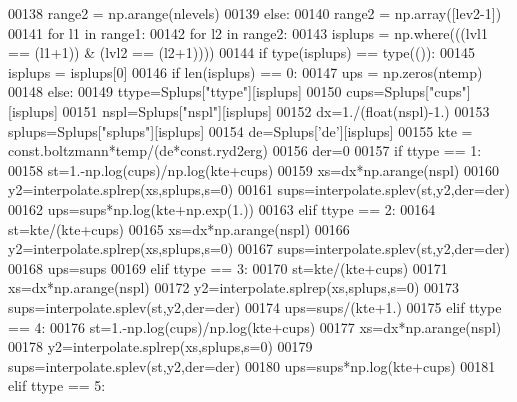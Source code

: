 \begin{DoxyCode}
00138         range2 = np.arange(nlevels)
00139     \textcolor{keywordflow}{else}:
00140         range2 = np.array([lev2-1])
00141     \textcolor{keywordflow}{for} l1 \textcolor{keywordflow}{in} range1:
00142         \textcolor{keywordflow}{for} l2 \textcolor{keywordflow}{in} range2:
00143             isplups = np.where(((lvl1 == (l1+1)) & (lvl2 == (l2+1))))
00144             \textcolor{keywordflow}{if} type(isplups) == type(()):
00145                 isplups = isplups[0]                
00146             \textcolor{keywordflow}{if} len(isplups) == 0:
00147                 ups = np.zeros(ntemp)
00148             \textcolor{keywordflow}{else}:
00149                 ttype=Splups[\textcolor{stringliteral}{"ttype"}][isplups]
00150                 cups=Splups[\textcolor{stringliteral}{"cups"}][isplups]
00151                 nspl=Splups[\textcolor{stringliteral}{"nspl"}][isplups]
00152                 dx=1./(float(nspl)-1.)
00153                 splups=Splups[\textcolor{stringliteral}{"splups"}][isplups]
00154                 de=Splups[\textcolor{stringliteral}{'de'}][isplups]
00155                 kte = const.boltzmann*temp/(de*const.ryd2erg)
00156                 der=0
00157                 \textcolor{keywordflow}{if} ttype == 1:
00158                     st=1.-np.log(cups)/np.log(kte+cups)
00159                     xs=dx*np.arange(nspl)
00160                     y2=interpolate.splrep(xs,splups,s=0)
00161                     sups=interpolate.splev(st,y2,der=der)
00162                     ups=sups*np.log(kte+np.exp(1.))
00163                 \textcolor{keywordflow}{elif} ttype == 2:
00164                     st=kte/(kte+cups)
00165                     xs=dx*np.arange(nspl)
00166                     y2=interpolate.splrep(xs,splups,s=0)
00167                     sups=interpolate.splev(st,y2,der=der)
00168                     ups=sups
00169                 \textcolor{keywordflow}{elif} ttype == 3:
00170                     st=kte/(kte+cups)
00171                     xs=dx*np.arange(nspl)
00172                     y2=interpolate.splrep(xs,splups,s=0)
00173                     sups=interpolate.splev(st,y2,der=der)
00174                     ups=sups/(kte+1.)
00175                 \textcolor{keywordflow}{elif} ttype == 4:
00176                     st=1.-np.log(cups)/np.log(kte+cups)
00177                     xs=dx*np.arange(nspl)
00178                     y2=interpolate.splrep(xs,splups,s=0)
00179                     sups=interpolate.splev(st,y2,der=der)
00180                     ups=sups*np.log(kte+cups)
00181                 \textcolor{keywordflow}{elif} ttype == 5:

\end{DoxyCode}
